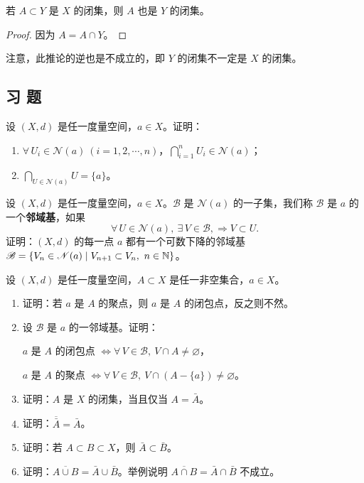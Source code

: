 \begin{mycor*}{}

若 $A\subset Y$ 是 $X$ 的闭集，则 $A$ 也是 $Y$ 的闭集。

\end{mycor*}

\begin{proof}

因为 $A=A\cap Y$。

\end{proof}

注意，此推论的逆也是不成立的，即 $Y$ 的闭集不一定是 $X$ 的闭集。

\subsection*{习 题}

\begin{exercise}
	\item 设 $(X,d)$ 是任一度量空间，$a\in X$。证明：
	\begin{enumerate}[label=\arabic*)]
		\item $\forall\,U_i\in\mathscr{N}(a)\ (i=1,2,\cdots,n)$，$\displaystyle\bigcap_{i=1}^nU_i\in\mathscr{N}(a)$；
		\item $\displaystyle\bigcap_{U\in\mathscr{N}(a)}U=\{a\}$。
	\end{enumerate}
\end{exercise}

\begin{exercise}
	\item 设 $(X,d)$ 是任一度量空间，$a\in X$。$\mathscr{B}$ 是 $\mathscr{N}(a)$ 的一子集，我们称 $\mathscr{B}$ 是 $a$ 的一个\textbf{邻域基}，如果
	\[\forall\,U\in\mathscr{N}(a),\ \exists\,V\in\mathscr{B},\Longrightarrow V\subset U.\]
	证明：$(X,d)$ 的每一点 $a$ 都有一个可数下降的邻域基 $\mathscr{B}=\{V_n\in\mathscr{N}(a)\mid V_{n+1}\subset V_n,\ n\in\mathbb{N}\}$。
\end{exercise}

\begin{exercise}
	\item 设 $(X,d)$ 是任一度量空间，$A\subset X$ 是任一非空集合，$a\in X$。
	\begin{enumerate}[label=\arabic*)]
		\item 证明：若 $a$ 是 $A$ 的聚点，则 $a$ 是 $A$ 的闭包点，反之则不然。
		\item 设 $\mathscr{B}$ 是 $a$ 的一邻域基。证明：

		$a$ 是 $A$ 的闭包点 $\Longleftrightarrow\forall\,V\in\mathscr{B},\ V\cap A\neq\varnothing$，

		$a$ 是 $A$ 的聚点 $\Longleftrightarrow\forall\,V\in\mathscr{B},\ V\cap(A-\{a\})\neq\varnothing$。
		\item 证明：$A$ 是 $X$ 的闭集，当且仅当 $A=\bar A$。
		\item 证明：$\overline{\bar A}=\bar A$。
		\item 证明：若 $A\subset B\subset X$，则 $\bar A\subset\bar B$。
		\item 证明：$\overline{A\cup B}=\bar A\cup\bar B$。举例说明 $\overline{A\cap B}=\bar A\cap\bar B$ 不成立。
	\end{enumerate}
\end{exercise}


